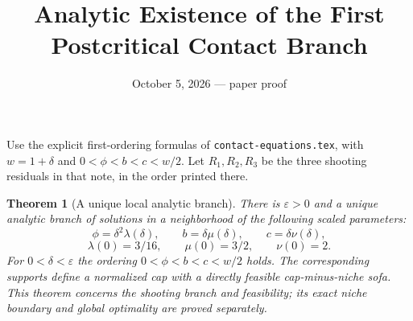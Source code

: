 \documentclass[11pt]{article}
\title{Analytic Existence of the First Postcritical Contact Branch}
\author{}\date{October 5, 2026 --- paper proof}
\newtheorem{theorem}{Theorem}
\begin{document}
\maketitle
Use the explicit first-ordering formulas of \texttt{contact-equations.tex}, with $w=1+\delta$ and $0<\phi<b<c<w/2$. Let $R_1,R_2,R_3$ be the three shooting residuals in that note, in the order printed there.

\begin{theorem}[A unique local analytic branch]
There is $\varepsilon>0$ and a unique analytic branch of solutions in a neighborhood of the following scaled parameters:
\[
 \phi=\delta^2\lambda(\delta),\qquad b=\delta\mu(\delta),\qquad c=\delta\nu(\delta),
\]
\[
 \lambda(0)=3/16,\qquad\mu(0)=3/2,\qquad\nu(0)=2.
\]
For $0<\delta<\varepsilon$ the ordering $0<\phi<b<c<w/2$ holds. The corresponding supports define a normalized cap with a directly feasible cap-minus-niche sofa. This theorem concerns the shooting branch and feasibility; its exact niche boundary and global optimality are proved separately.
\end{theorem}
\end{document}
